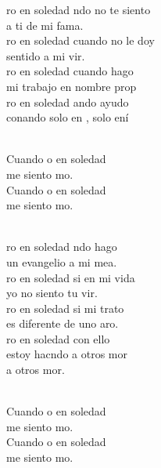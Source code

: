 \documentclass[12pt]{article}
\begin{document}
\begin{multicols*}{2}
\begin{cancion}%
	ro en soledad ndo no te siento \\
	a ti de mi fama.\\
	ro en soledad cuando no le doy \\
	sentido a mi vir.\\
	ro en soledad cuando hago \\
	mi trabajo en nombre prop\\
	ro en soledad ando ayudo \\
	conando solo en , solo ení\\\jump\\
	\begin{chorus}%
	Cuando o en soledad \\
	me siento mo.\\
	Cuando o en soledad \\
	me siento mo. \\
	\end{chorus}%
	\jump\\
	ro en soledad ndo hago \\
	un evangelio a mi mea.\\
	ro en soledad si en mi vida\\
	yo no siento tu vir.\\
	ro en soledad si mi trato \\
	es diferente de uno aro.\\
	ro en soledad con ello \\
	estoy hacndo a otros mor \\
	a otros mor.\\\jump\\
	\begin{chorus}%
	Cuando o en soledad \\
	me siento mo.\\
	Cuando o en soledad \\
	me siento mo. \\

\end{chorus}
\end{cancion}
\end{multicols*}
\end{document}
